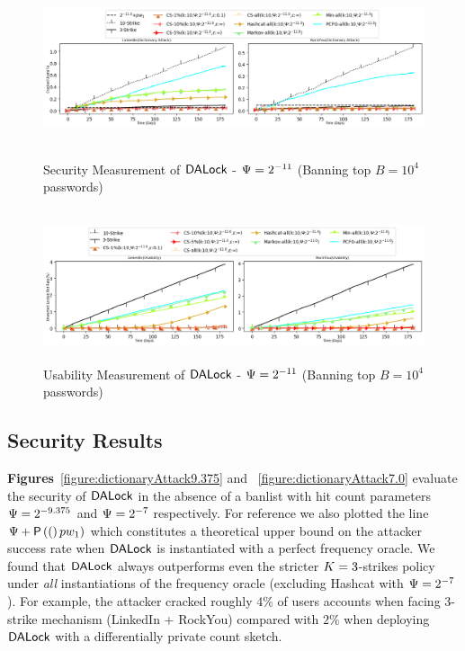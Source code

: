 \begin{figure}\label{key2}
	\includegraphics[width=\linewidth, height = 4.5cm]{Figures/Experiments/Attacker/DictionaryAttackPrune.png}
	\vspace{-0.8cm}
	\caption{Security Measurement of $\mathsf{DALock}$ - $\Psi = 2^{-11}$ (Banning top $B=10^4$ passwords)  }\label{figure:dictionaryAttackPrune}
	\includegraphics[width=\linewidth, height = 4.5cm]{Figures/Experiments/Utility/UtilityPrune.png}
	\vspace{-0.8cm}
	\caption{Usability Measurement of $\mathsf{DALock}$ - $\Psi = 2^{-11}$ (Banning top $B=10^4$ passwords)}\label{figure:usabilityPrune}
	\vspace{-0.6cm}
\end{figure}



\subsection{Security Results} \label{section:ExperimentResult-security} %
\textbf{Figures}~\ref{figure:dictionaryAttack9.375} and ~\ref{figure:dictionaryAttack7.0} evaluate the security of $\mathsf{DALock}$ in the absence of a banlist with hit count parameters $\Psi = 2^{-9.375}$ and $\Psi=2^{-7}$ respectively. For reference we also plotted the line $\Psi + \mathsf{P}\left((\right)pw_1)$ which constitutes a theoretical upper bound on the attacker success rate when $\mathsf{DALock}$ is instantiated with a perfect frequency oracle. We found that $\mathsf{DALock}$ always outperforms even the stricter $K=3$-strikes policy under {\em all} instantiations of the frequency oracle (excluding Hashcat with $\Psi=2^{-7}$). For example, the attacker cracked roughly 4\% of users accounts when facing 3-strike mechanism (LinkedIn + RockYou) compared with $2\%$ when deploying $\mathsf{DALock}$  with a differentially private count sketch.

